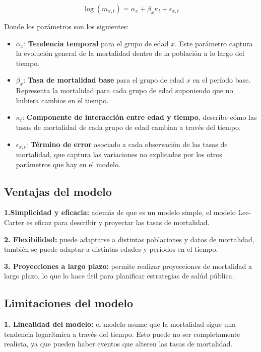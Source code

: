 \documentclass[
]{article}
\providecommand{\tightlist}{%
  \setlength{\itemsep}{0pt}\setlength{\parskip}{0pt}}
\begin{document}
\[
\log(m_{x,t}) = \alpha_x + \beta_x \kappa_t + \epsilon_{x,t}
\]

Donde los parámetros son los siguientes:

\begin{itemize}
\tightlist
\item
  \(\alpha_x\): \textbf{Tendencia temporal} para el grupo de edad \(x\).
  Este parámetro captura la evolución general de la mortalidad dentro de
  la población a lo largo del tiempo.
\item
  \(\beta_x\): \textbf{Tasa de mortalidad base} para el grupo de edad
  \(x\) en el período base. Representa la mortalidad para cada grupo de
  edad suponiendo que no hubiera cambios en el tiempo.
\item
  \(\kappa_t\): \textbf{Componente de interacción entre edad y tiempo},
  describe cómo las tasas de mortalidad de cada grupo de edad cambian a
  través del tiempo.
\item
  \(\epsilon_{x,t}\): \textbf{Término de error} asociado a cada
  observación de las tasas de mortalidad, que captura las variaciones no
  explicadas por los otros parámetros que hay en el modelo.
\end{itemize}

\hypertarget{ventajas-del-modelo}{%
\subsection{Ventajas del modelo}\label{ventajas-del-modelo}}

\textbf{1.Simplicidad y eficacia:} además de que es un modelo simple, el
modelo Lee-Carter es eficaz para describir y proyectar las tasas de
mortalidad.

\textbf{2. Flexibilidad:} puede adaptarse a distintas poblaciones y
datos de mortalidad, también se puede adaptar a distintas edades y
períodos en el tiempo.

\textbf{3. Proyecciones a largo plazo:} permite realizar proyecciones de
mortalidad a largo plazo, lo que lo hace útil para planificar
estrategias de salúd pública.

\hypertarget{limitaciones-del-modelo}{%
\subsection{Limitaciones del modelo}\label{limitaciones-del-modelo}}

\textbf{1. Linealidad del modelo:} el modelo asume que la mortalidad
sigue una tendencia logarítmica a través del tiempo. Esto puede no ser
completamente realista, ya que pueden haber eventos que alteren las
tasas de mortalidad.
\end{document}

